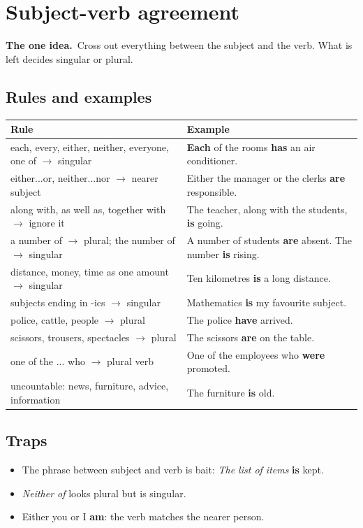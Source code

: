 \documentclass[11pt,a4paper]{article}
\let\oldsection\section
\renewcommand{\section}{\clearpage\oldsection}
\newcommand{\oneidea}[1]{\par\medskip\noindent\begingroup\setlength{\fboxsep}{7pt}%
  \colorbox{codebg}{\parbox{\dimexpr\linewidth-14pt\relax}{\textbf{\color{ember}The one idea.}\ #1}}\endgroup\par\medskip}
\newcommand{\good}[1]{\textbf{#1}}
\begin{document}
\section{Subject-verb agreement}
\oneidea{Cross out everything between the subject and the verb. What is left decides singular or plural.}
\subsection*{Rules and examples}
\begin{center}\small\renewcommand{\arraystretch}{1.25}
\begin{tabularx}{\linewidth}{@{}>{\raggedright\arraybackslash}p{5cm} >{\raggedright\arraybackslash}X@{}}
\toprule
\textbf{Rule} & \textbf{Example}\\
\midrule
each, every, either, neither, everyone, one of $\rightarrow$ singular & \good{Each} of the rooms \good{has} an air conditioner.\\
either...or, neither...nor $\rightarrow$ nearer subject & Either the manager or the clerks \good{are} responsible.\\
along with, as well as, together with $\rightarrow$ ignore it & The teacher, along with the students, \good{is} going.\\
a number of $\rightarrow$ plural; the number of $\rightarrow$ singular & A number of students \good{are} absent. The number \good{is} rising.\\
distance, money, time as one amount $\rightarrow$ singular & Ten kilometres \good{is} a long distance.\\
subjects ending in -ics $\rightarrow$ singular & Mathematics \good{is} my favourite subject.\\
police, cattle, people $\rightarrow$ plural & The police \good{have} arrived.\\
scissors, trousers, spectacles $\rightarrow$ plural & The scissors \good{are} on the table.\\
one of the ... who $\rightarrow$ plural verb & One of the employees who \good{were} promoted.\\
uncountable: news, furniture, advice, information & The furniture \good{is} old.\\
\bottomrule
\end{tabularx}
\end{center}
\subsection*{Traps}
\begin{itemize}
\item The phrase between subject and verb is bait: \emph{The list of items} \good{is} kept.
\item \emph{Neither of} looks plural but is singular.
\item Either you or I \good{am}: the verb matches the nearer person.
\end{itemize}
\end{document}
